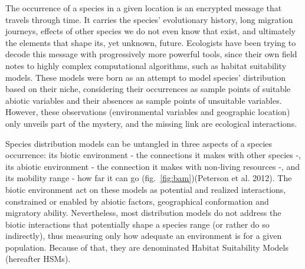 \documentclass[11pt]{article}
\begin{document}
The occurrence of a species in a given location is an encrypted message
that travels through time. It carries the species' evolutionary history,
long migration journeys, effects of other species we do not even know
that exist, and ultimately the elements that shape its, yet unknown,
future. Ecologists have been trying to decode this message with
progressively more powerful tools, since their own field notes to highly
complex computational algorithms, such as habitat suitability models.
These models were born as an attempt to model species' distribution
based on their niche, considering their occurrences as sample points of
suitable abiotic variables and their absences as sample points of
unsuitable variables. However, these observations (environmental
variables and geographic location) only unveils part of the mystery, and
the missing link are ecological interactions.

Species distribution models can be untangled in three aspects of a
species occurrence: its biotic environment - the connections it makes
with other species -, its abiotic environment - the connection it makes
with non-living resources -, and its mobility range - how far it can go
(fig.~\ref{fig:bam})(Peterson et al. 2012). The biotic environment act
on these models as potential and realized interactions, constrained or
enabled by abiotic factors, geographical conformation and migratory
ability. Nevertheless, most distribution models do not address the
biotic interactions that potentially shape a species range (or rather do
so indirectly), thus measuring only how adequate an environment is for a
given population. Because of that, they are denominated Habitat
Suitability Models (hereafter HSMs).
\end{document}
